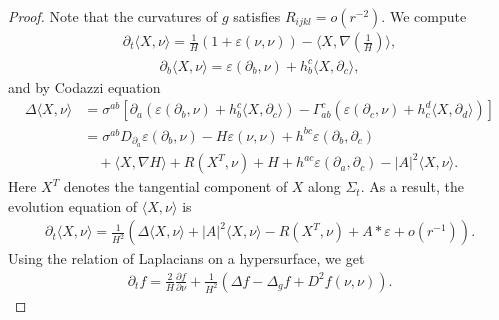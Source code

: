 \documentclass[12pt,twoside]{article}
\theoremstyle{plain}
\theoremstyle{definition}
\theoremstyle{remark}
\newcommand{\pl}{\partial}
\newcommand{\na}{\nabla}
\newcommand{\lt}{\left}
\newcommand{\rt}{\right}
\numberwithin{equation}{section}
\begin{document}
\begin{proof}
Note that the curvatures of $g$ satisfies $R_{ijkl} = o(r^{-2})$. We compute
\begin{align*}
\pl_t \langle X,\nu \rangle = \frac{1}{H} \lt( 1 + \varepsilon(\nu,\nu) \rt) - \langle X, \na (\frac{1}{H}) \rangle,
\end{align*}
\begin{align}\label{gradXnu}
\pl_b \langle X,\nu \rangle = \varepsilon(\pl_b, \nu) + h_b^c \langle X,\pl_c \rangle, 
\end{align}
and by Codazzi equation
\begin{align*}
\Delta \langle X,\nu \rangle &= \sigma^{ab} \lt[ \pl_a \lt( \varepsilon(\pl_b, \nu) + h_b^c \langle X,\pl_c \rangle \rt) - \Gamma_{ab}^c \lt( \varepsilon(\pl_c,\nu) + h_c^d \langle X, \pl_d \rangle \rt)\rt]\\
&= \sigma^{ab} D_{\pl_a} \varepsilon (\pl_b,\nu) - H \varepsilon(\nu,\nu) + h^{bc} \varepsilon(\pl_b,\pl_c) \\
&\quad + \langle X,\na H \rangle + R(X^T, \nu) + H + h^{ac} \varepsilon(\pl_a, \pl_c) - |A|^2 \langle X,\nu \rangle.
\end{align*}
Here $X^T$ denotes the tangential component of $X$ along $\Sigma_t$.  As a result, the evolution equation of $\langle X,\nu \rangle$ is 
\begin{align*}
\pl_t \langle X,\nu \rangle = \frac{1}{H^2} \lt( \Delta \langle X,\nu \rangle + |A|^2 \langle X,\nu \rangle - R(X^T,\nu) + A * \varepsilon + o(r^{-1}) \rt).
\end{align*}
Using the relation of Laplacians on a hypersurface, we get 
\begin{align*}
\pl_t f = \frac{2}{H} \frac{\pl f}{\pl\nu} + \frac{1}{H^2} \lt( \Delta f - \Delta_g f + D^2 f(\nu,\nu) \rt).
\end{align*}


\end{proof}
\end{document}
